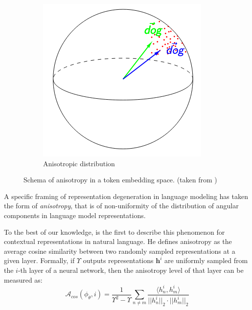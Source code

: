 \begin{figure}[ht]
\begin{subfigure}[b]{0.3\textwidth}
        \includegraphics[width=\textwidth]{sources/related_works/imgs/anisotropy_kawin_2.png}
        \caption{Anisotropic distribution}
        \label{fig:aniso}
    \end{subfigure}
    \caption{Schema of anisotropy in a token embedding space. (taken from \citet{ethayarajh-2019-contextual})}
    \label{fig:anisotropy}
\end{figure}


A specific framing of representation degeneration in language modeling has taken the form of \textit{anisotropy}, that is of non-uniformity of the distribution of angular components in language model representations. 

To the best of our knowledge, \citet{ethayarajh-2019-contextual} is the first to describe this phenomenon for contextual representations in natural language. He defines anisotropy as the average cosine similarity between two randomly sampled representations at a given layer. Formally, if $\Upsilon$ outputs representations $\mathbf{h}^i$ are uniformly sampled from the $i$-th layer of a neural network, then the anisotropy level of that layer can be measured as:
\begin{equation}
    \label{eq:anisotropy_cos_def}
    \mathcal{A}_{cos}(\phi_\theta, i) = \frac{1}{\Upsilon^2 - \Upsilon} \sum_{n \neq m} \frac{\langle h^i_n, h^i_m \rangle}{||h^i_n||_2 \cdot||h^i_m||_2 }
\end{equation}


